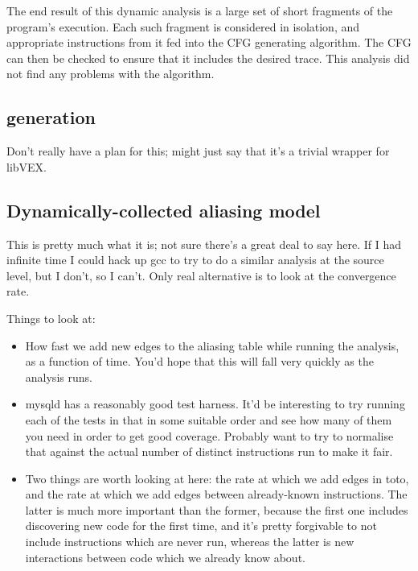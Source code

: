 The end result of this dynamic analysis is a large set of short
fragments of the program's execution.  Each such fragment is
considered in isolation, and appropriate instructions
from it fed into the CFG generating algorithm.  The CFG can then be
checked to ensure that it includes the desired trace.  This analysis
did not find any problems with the algorithm.


\subsection{{\STateMachine} generation}

Don't really have a plan for this; might just say that it's a trivial
wrapper for libVEX.

\subsection{Dynamically-collected aliasing model}

This is pretty much what it is; not sure there's a great deal to say
here.  If I had infinite time I could hack up gcc to try to do a
similar analysis at the source level, but I don't, so I can't.  Only
real alternative is to look at the convergence rate.

Things to look at:

\begin{itemize}
\item How fast we add new edges to the aliasing table while running
  the analysis, as a function of time.  You'd hope that this will fall
  very quickly as the analysis runs.
\item mysqld has a reasonably good test harness.  It'd be interesting
  to try running each of the tests in that in some suitable order and
  see how many of them you need in order to get good coverage.
  Probably want to try to normalise that against the actual number of
  distinct instructions run to make it fair.
\item Two things are worth looking at here: the rate at which we add
  edges in toto, and the rate at which we add edges between
  already-known instructions.  The latter is much more important than
  the former, because the first one includes discovering new code for
  the first time, and it's pretty forgivable to not include
  instructions which are never run, whereas the latter is new
  interactions between code which we already know about.
\end{itemize}

